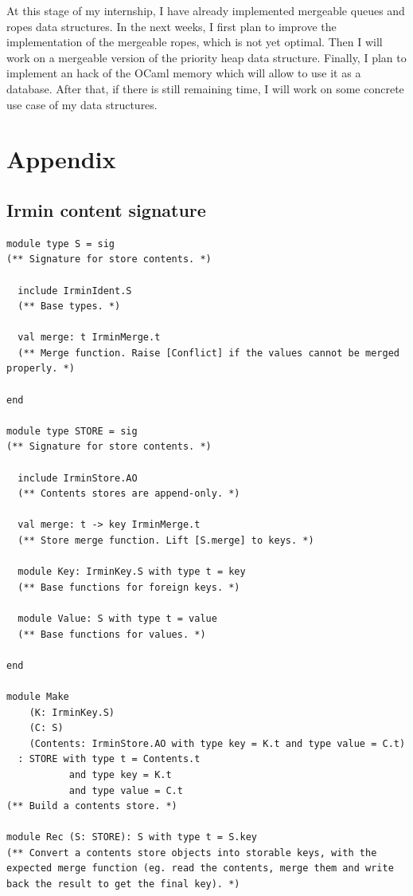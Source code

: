 \documentclass{article}
\renewcommand{\-}{\hyp}
\newcommand{\irmin}{Irmin\xspace}
\newcommand{\ocaml}{OCaml\xspace}
\begin{document}
At this stage of my internship, I have already implemented mergeable queues and ropes data structures.
In the next weeks, I first plan to improve the implementation of the mergeable ropes, which is not yet optimal.
Then I will work on a mergeable version of the priority heap data structure.
Finally, I plan to implement an hack of the \ocaml memory which will allow to use it as a database.
After that, if there is still remaining time, I will work on some concrete use case of my data structures.

\nocite{*}



\newpage

\section*{Appendix}
\addtocounter{section}{1}
\setcounter{subsection}{0}
\renewcommand{\thesubsection}{\Alph{subsection}}

\subsection{\irmin content signature\label{appendixcontent}}
\begin{lstlisting}
module type S = sig
(** Signature for store contents. *)

  include IrminIdent.S
  (** Base types. *)

  val merge: t IrminMerge.t
  (** Merge function. Raise [Conflict] if the values cannot be merged properly. *)

end

module type STORE = sig
(** Signature for store contents. *)

  include IrminStore.AO
  (** Contents stores are append-only. *)

  val merge: t -> key IrminMerge.t
  (** Store merge function. Lift [S.merge] to keys. *)

  module Key: IrminKey.S with type t = key
  (** Base functions for foreign keys. *)

  module Value: S with type t = value
  (** Base functions for values. *)

end

module Make
    (K: IrminKey.S)
    (C: S)
    (Contents: IrminStore.AO with type key = K.t and type value = C.t)
  : STORE with type t = Contents.t
           and type key = K.t
           and type value = C.t
(** Build a contents store. *)

module Rec (S: STORE): S with type t = S.key
(** Convert a contents store objects into storable keys, with the expected merge function (eg. read the contents, merge them and write back the result to get the final key). *)
\end{lstlisting}
\end{document}
